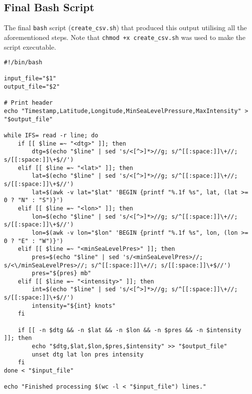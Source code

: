 \documentclass[]{article}
\begin{document}
    \subsection{Final Bash Script}
    The final \verb|bash| script (\verb|create_csv.sh|) that produced this output utilising all the aforementioned steps. Note that \verb|chmod +x create_csv.sh| was used to make the script executable.
    \begin{verbatim}
#!/bin/bash

input_file="$1"
output_file="$2"

# Print header
echo "Timestamp,Latitude,Longitude,MinSeaLevelPressure,MaxIntensity" > "$output_file"

while IFS= read -r line; do
    if [[ $line =~ "<dtg>" ]]; then
        dtg=$(echo "$line" | sed 's/<[^>]*>//g; s/^[[:space:]]\+//; s/[[:space:]]\+$//')
    elif [[ $line =~ "<lat>" ]]; then
        lat=$(echo "$line" | sed 's/<[^>]*>//g; s/^[[:space:]]\+//; s/[[:space:]]\+$//')
        lat=$(awk -v lat="$lat" 'BEGIN {printf "%.1f %s", lat, (lat >= 0 ? "N" : "S")}')
    elif [[ $line =~ "<lon>" ]]; then
        lon=$(echo "$line" | sed 's/<[^>]*>//g; s/^[[:space:]]\+//; s/[[:space:]]\+$//')
        lon=$(awk -v lon="$lon" 'BEGIN {printf "%.1f %s", lon, (lon >= 0 ? "E" : "W")}')
    elif [[ $line =~ "<minSeaLevelPres>" ]]; then
        pres=$(echo "$line" | sed 's/<minSeaLevelPres>//; s/<\/minSeaLevelPres>//; s/^[[:space:]]\+//; s/[[:space:]]\+$//')
        pres="${pres} mb"
    elif [[ $line =~ "<intensity>" ]]; then
        int=$(echo "$line" | sed 's/<[^>]*>//g; s/^[[:space:]]\+//; s/[[:space:]]\+$//')
        intensity="${int} knots"
    fi

    if [[ -n $dtg && -n $lat && -n $lon && -n $pres && -n $intensity ]]; then
        echo "$dtg,$lat,$lon,$pres,$intensity" >> "$output_file"
        unset dtg lat lon pres intensity
    fi
done < "$input_file"

echo "Finished processing $(wc -l < "$input_file") lines."
    \end{verbatim}
\end{document}
